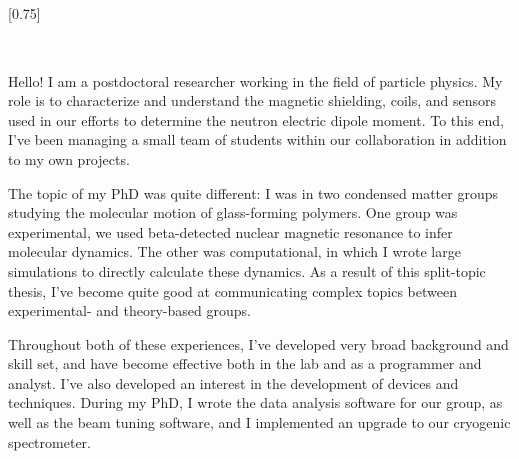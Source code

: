 \documentclass[lighthipster]{simplehipstercv}
\begin{document}
\thispagestyle{empty}

\subsection*{}

\vspace{5.38em}

\setlength{\columnsep}{1.5cm}
[0.75]
\begin{paracol}{2}

\paracolbackgroundoptions


\footnotesize
{\setasidefontcolour
{}

\hfill{}\\[0.5em]

{\footnotesize

Hello! I am a postdoctoral researcher working in the field of particle physics. My role is to characterize and understand the magnetic shielding, coils, and sensors used in our efforts to determine the neutron electric dipole moment. To this end, I've been managing a small team of students within our collaboration in addition to my own projects.
\bigskip

The topic of my PhD was quite different: I was in two condensed matter groups studying the molecular motion of glass-forming polymers. One group was experimental, we used beta-detected nuclear magnetic resonance to infer molecular dynamics. The other was computational, in which I wrote large simulations to directly calculate these dynamics. As a result of this split-topic thesis, I've become quite good at communicating complex topics between experimental- and theory-based groups.
\bigskip

Throughout both of these experiences, I've developed very broad background and skill set, and have become effective both in the lab and as a programmer and analyst. I've also developed an interest in the development of devices and techniques. During my PhD, I wrote the data analysis software for our group, as well as the beam tuning software, and I implemented an upgrade to our cryogenic spectrometer.
}
\bigskip

}
\end{paracol}
\end{document}
